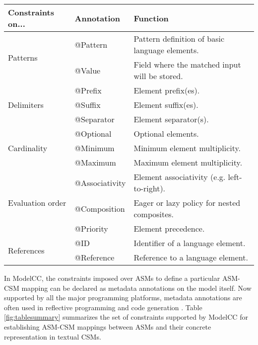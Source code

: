 \documentclass[floatfix,rmp,twocolumn,twoside]{revtex4}
\begin{document}
\begin{table*}[tb]
\begin{center}

\setlength{\tabcolsep}{5pt}
\begin{tabular}{ l  l  l } \hline

Constraints on... & Annotation & Function \\ \hline

\multirow{2}{*}{Patterns}
& @Pattern & Pattern definition of basic language elements. \\
& @Value & Field where the matched input will be stored. \\ \hline

\multirow{3}{*}{Delimiters}
& @Prefix & Element prefix(es). \\
& @Suffix & Element suffix(es). \\
& @Separator & Element separator(s). \\ \hline

\multirow{3}{*}{Cardinality}
& @Optional & Optional elements.\\
& @Minimum & Minimum element multiplicity.\\
& @Maximum & Maximum element multiplicity.\\ \hline

\multirow{3}{50pt}{Evaluation order}
& @Associativity & Element associativity (e.g. left-to-right). \\
& @Composition & Eager or lazy policy for nested composites. \\
& @Priority & Element precedence. \\ \hline

\multirow{2}{*}{References}
& @ID & Identifier of a language element. \\
& @Reference & Reference to a language element. \\ \hline

\end{tabular}
\end{center}
\caption{Summary of the basic metadata annotations supported by ModelCC.} \label{fig:tablesummary}
\end{table*}

\noindent In ModelCC, the constraints imposed over ASMs to define a particular ASM-CSM mapping can be declared as metadata annotations on the model itself. Now supported by all the major programming platforms, metadata annotations are often used in reflective programming and code generation \cite{Fowler2002}. Table \ref{fig:tablesummary} summarizes the set of constraints supported by ModelCC for establishing ASM-CSM mappings between ASMs and their concrete representation in textual CSMs.
\end{document}
